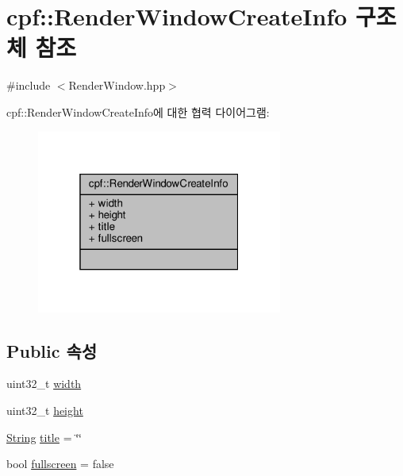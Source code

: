 \hypertarget{structcpf_1_1_render_window_create_info}{}\section{cpf\+:\+:Render\+Window\+Create\+Info 구조체 참조}
\label{structcpf_1_1_render_window_create_info}


{\ttfamily \#include $<$Render\+Window.\+hpp$>$}



cpf\+:\+:Render\+Window\+Create\+Info에 대한 협력 다이어그램\+:
\nopagebreak
\begin{figure}[H]
\begin{center}
\leavevmode
\includegraphics[width=229pt]{structcpf_1_1_render_window_create_info__coll__graph}
\end{center}
\end{figure}
\subsection*{Public 속성}
\begin{DoxyCompactItemize}
\item 
uint32\+\_\+t \hyperlink{structcpf_1_1_render_window_create_info_a28983e1803a3065c8cc8beacb2b72f22}{width}
\item 
uint32\+\_\+t \hyperlink{structcpf_1_1_render_window_create_info_a6af4056c0776858a053126de8c2b9011}{height}
\item 
\hyperlink{namespacecpf_a4dbd6992c3ed4440ce7ed8982ff7ffea}{String} \hyperlink{structcpf_1_1_render_window_create_info_a47f2dbdd922a53792e16bd650064c77e}{title} = \char`\"{}\char`\"{}
\item 
bool \hyperlink{structcpf_1_1_render_window_create_info_a72ea6911da5c022c63670045041b86c3}{fullscreen} = false
\end{DoxyCompactItemize}


